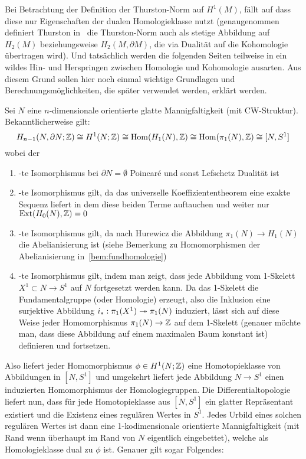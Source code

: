 	Bei Betrachtung der Definition der Thurston-Norm auf $H^1(M)$, fällt auf dass diese nur Eigenschaften der dualen Homologieklasse nutzt (genaugenommen definiert Thurston in~\cite{Thurston.1986} die Thurston-Norm auch als stetige Abbildung auf $H_2(M)$ beziehungsweise $H_2(M,\partial M)$, die via Dualität auf die Kohomologie übertragen wird). Und tatsächlich werden die folgenden Seiten teilweise in ein wildes Hin- und Herspringen zwischen Homologie und Kohomologie ausarten. Aus diesem Grund sollen hier noch einmal wichtige Grundlagen und Berechnungsmöglichkeiten, die später verwendet werden, erklärt werden.
	\begin{bem}
	Sei $N$ eine $n$-dimensionale orientierte glatte Mannigfaltigkeit (mit CW-Struktur).
		Bekanntlicherweise gilt:
		\[
					H_{n-1}(N,\partial N;\mathbb{Z})\cong H^1(N;\mathbb{Z}) \cong \operatorname{Hom}(H_1(N),\mathbb{Z}) \cong \operatorname{Hom}(\pi_1(N),\mathbb{Z}) \cong  [N,S^1]
		\]		
		wobei der
		\begin{enumerate}
			\item -te Isomorphismus bei $\partial N= \emptyset$ Poincaré und sonst Lefschetz Dualität ist
			\item -te Isomorphismus gilt, da das universelle Koeffiziententheorem eine exakte Sequenz liefert in dem diese beiden Terme auftauchen und weiter nur $\operatorname{Ext}(H_0(N),\mathbb{Z}) = 0$
			\item -te Isomorphismus gilt, da nach Hurewicz die Abbildung $\pi_1(N)\to H_1(N)$ die Abelianisierung ist (siehe Bemerkung zu Homomorphismen der Abelianisierung in~\ref{bem:fundhomologie})
			\item -te Isomorphismus gilt, indem man zeigt, dass jede Abbildung vom 1-Skelett $X^1 \subset N \to S^1$ auf $N$ fortgesetzt werden kann. Da das 1-Skelett die Fundamentalgruppe (oder Homologie) erzeugt, also die Inklusion eine surjektive Abbildung $i_*:\pi_1(X^1)\twoheadrightarrow\pi_1(N)$ induziert, lässt sich auf diese Weise jeder Homomorphismus $\pi_1(N)\to \mathbb{Z}$ auf dem 1-Skelett (genauer möchte man, dass diese Abbildung auf einem maximalen Baum konstant ist) definieren und fortsetzen. 
		\end{enumerate}
	Also liefert jeder Homomorphismus $\phi \in H^1(N;\mathbb{Z})$ eine Homotopieklasse von Abbildungen in $[N,S^1]$ und umgekehrt liefert jede Abbildung $N\to S^1$ einen induzierten Homomorphismus der Homologiegruppen. Die Differentialtopologie liefert nun, dass für jede Homotopieklasse aus $[N,S^1]$ ein glatter Repräsentant existiert und die Existenz eines regulären Wertes in $S^1$. Jedes Urbild eines solchen regulären Wertes ist dann eine 1-kodimensionale orientierte Mannigfaltigkeit (mit Rand wenn überhaupt im Rand von $N$ eigentlich eingebettet), welche als Homologieklasse dual zu $\phi$ ist. Genauer gilt sogar Folgendes:

\end{bem}
